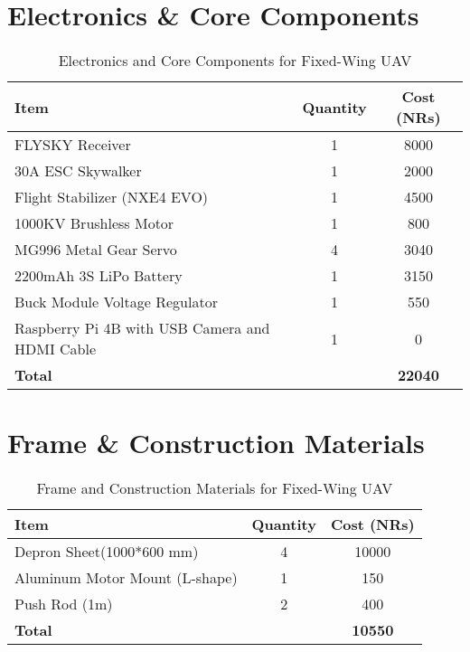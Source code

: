 \section*{Electronics \& Core Components}
\begin{table}[h]
\centering
\begin{tabular}{l c S[table-format=5.0]}
\toprule
\textbf{Item} & \textbf{Quantity} & \textbf{Cost (NRs)} \\
\midrule
FLYSKY Receiver & 1 & 8000 \\
30A ESC Skywalker & 1 & 2000 \\
Flight Stabilizer (NXE4 EVO) & 1 & 4500 \\
1000KV Brushless Motor & 1 & 800 \\
MG996 Metal Gear Servo & 4 & 3040 \\
2200mAh 3S LiPo Battery & 1 & 3150 \\
Buck Module Voltage Regulator & 1 & 550 \\
Raspberry Pi 4B with USB Camera and HDMI Cable & 1 & 0 \\
\midrule
\textbf{Total} & & \textbf{22040} \\
\bottomrule
\end{tabular}
\caption{Electronics and Core Components for Fixed-Wing UAV}
\end{table}

\section*{Frame \& Construction Materials}
\begin{table}[h]
\centering
\begin{tabular}{l c S[table-format=5.0]}
\toprule
\textbf{Item} & \textbf{Quantity} & \textbf{Cost (NRs)} \\
\midrule
Depron Sheet(1000*600 mm) & 4 & 10000 \\
Aluminum Motor Mount (L-shape) & 1 & 150 \\
Push Rod (1m) & 2 & 400 \\
\midrule
\textbf{Total} & & \textbf{10550} \\
\bottomrule
\end{tabular}
\caption{Frame and Construction Materials for Fixed-Wing UAV}
\end{table}

\newpage
